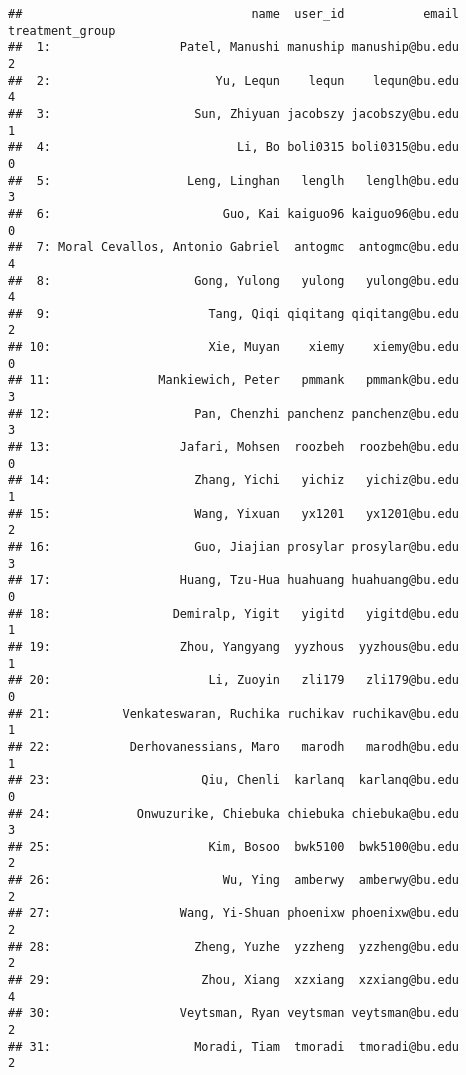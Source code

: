 \documentclass[
]{article}
\begin{document}
\begin{verbatim}
##                                name  user_id           email treatment_group
##  1:                  Patel, Manushi manuship manuship@bu.edu               2
##  2:                       Yu, Lequn    lequn    lequn@bu.edu               4
##  3:                    Sun, Zhiyuan jacobszy jacobszy@bu.edu               1
##  4:                          Li, Bo boli0315 boli0315@bu.edu               0
##  5:                   Leng, Linghan   lenglh   lenglh@bu.edu               3
##  6:                        Guo, Kai kaiguo96 kaiguo96@bu.edu               0
##  7: Moral Cevallos, Antonio Gabriel  antogmc  antogmc@bu.edu               4
##  8:                    Gong, Yulong   yulong   yulong@bu.edu               4
##  9:                      Tang, Qiqi qiqitang qiqitang@bu.edu               2
## 10:                      Xie, Muyan    xiemy    xiemy@bu.edu               0
## 11:               Mankiewich, Peter   pmmank   pmmank@bu.edu               3
## 12:                    Pan, Chenzhi panchenz panchenz@bu.edu               3
## 13:                  Jafari, Mohsen  roozbeh  roozbeh@bu.edu               0
## 14:                    Zhang, Yichi   yichiz   yichiz@bu.edu               1
## 15:                    Wang, Yixuan   yx1201   yx1201@bu.edu               2
## 16:                    Guo, Jiajian prosylar prosylar@bu.edu               3
## 17:                  Huang, Tzu-Hua huahuang huahuang@bu.edu               0
## 18:                 Demiralp, Yigit   yigitd   yigitd@bu.edu               1
## 19:                  Zhou, Yangyang  yyzhous  yyzhous@bu.edu               1
## 20:                      Li, Zuoyin   zli179   zli179@bu.edu               0
## 21:          Venkateswaran, Ruchika ruchikav ruchikav@bu.edu               1
## 22:           Derhovanessians, Maro   marodh   marodh@bu.edu               1
## 23:                     Qiu, Chenli  karlanq  karlanq@bu.edu               0
## 24:            Onwuzurike, Chiebuka chiebuka chiebuka@bu.edu               3
## 25:                      Kim, Bosoo  bwk5100  bwk5100@bu.edu               2
## 26:                        Wu, Ying  amberwy  amberwy@bu.edu               2
## 27:                  Wang, Yi-Shuan phoenixw phoenixw@bu.edu               2
## 28:                    Zheng, Yuzhe  yzzheng  yzzheng@bu.edu               2
## 29:                     Zhou, Xiang  xzxiang  xzxiang@bu.edu               4
## 30:                  Veytsman, Ryan veytsman veytsman@bu.edu               2
## 31:                    Moradi, Tiam  tmoradi  tmoradi@bu.edu               2

\end{verbatim}
\end{document}
